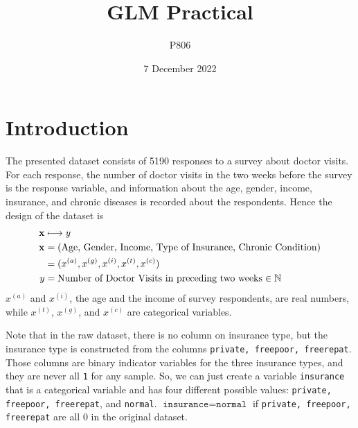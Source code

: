 \documentclass[a4paper,11pt]{article}
\title{GLM Practical}
\author{P806}
\date{7 December 2022}
\begin{document}
\newcommand{\E}{\mathrm{E}}

\newcommand{\Var}{\mathrm{Var}}

\newcommand{\Cov}{\mathrm{Cov}}

\maketitle

\section{Introduction}
The presented dataset consists of 5190 responses to a survey about doctor visits. For each response, the number of doctor visits in the two weeks before the survey is the response variable, and information about the age, gender, income, insurance, and chronic diseases is recorded about the respondents. Hence the design of the dataset is
\begin{align*}
\centering
\mathbf{x}  & \longmapsto y \\
\mathbf{x} &= (\text{Age, Gender, Income, Type of Insurance, Chronic Condition}) \\
 &= (x^{(a)}, x^{(g)}, x^{(i)}, x^{(t)}, x^{(c)}) \\
y &= \text{Number of Doctor Visits in preceding two weeks} \in \mathbb{N}
\end{align*}
$x^{(a)}$ and $x^{(i)}$, the age and the income of survey respondents, are real numbers, while $x^{(t)}$, $x^{(g)}$, and $x^{(c)}$ are categorical variables.

Note that in the raw dataset, there is no column on insurance type, but the insurance type is constructed from the columns \texttt{private, freepoor, freerepat}. Those columns are binary indicator variables for the three insurance types, and they are never all \texttt{1} for any sample. So, we can just create a variable \texttt{insurance} that is a categorical variable and has four different possible values: \texttt{private, freepoor, freerepat}, and \texttt{normal}. $\texttt{insurance} = \texttt{normal}$  if \texttt{private, freepoor, freerepat} are all $0$ in the original dataset.
\end{document}
